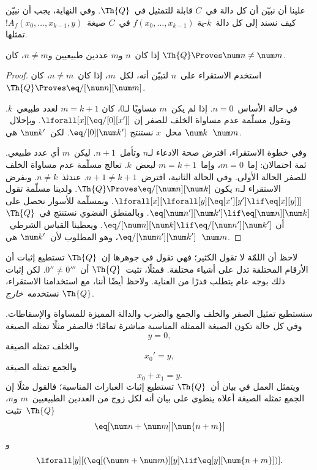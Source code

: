 \documentclass[../../../include/open-logic-section]{subfiles}
\begin{document}

علينا أن نبيّن أن كل دالة في~$C$ قابلة للتمثيل في~$\Th{Q}$. وفي
النهاية، يجب أن نبيّن كيف نسند إلى كل دالة~$k$-ية
$f(x_0,\dots,x_{k-1})$ في~$C$ صيغة~$!A_f(x_0,\dots,x_{k-1},y)$
تمثلها.

\begin{lem}
إذا كان~$n$ و$m$ عددين طبيعيين و$n \neq m$، كان
$\Th{Q} \Proves \num n \neq \num m$.
\end{lem}

\begin{proof}
استخدم الاستقراء على~$n$ لتبيّن أنه، لكل~$m$، إذا كان~$n \neq m$،
كان~$\Th{Q} \Proves \eq/[\num n][\num m]$.

في حالة الأساس~$n = 0$. إذا لم يكن~$m$ مساويًا لـ$0$، كان
$m = k + 1$ لعدد طبيعي~$k$. وتقول مسلّمة عدم مساواة الخلف للصفر إن
$\lforall[x][\eq/[0][x']]$. وبإحلال~$\num k$ محل~$x$ نستنتج
$\eq/[0][\num k']$. لكن~$\num k'$ هي~$\num m$.

وفي خطوة الاستقراء، افترض صحة الادعاء لـ$n$ وتأمل~$n+1$. ليكن~$m$
أي عدد طبيعي. ثمة احتمالان: إما~$m = 0$، وإما~$m = k+1$ لبعض~$k$.
تعالج مسلّمة عدم مساواة الخلف للصفر الحالة الأولى. وفي الحالة الثانية،
افترض~$n+1 \neq k+1$. عندئذ~$n \neq k$. وبفرض الاستقراء لـ$n$ يكون
$\Th{Q} \Proves \eq/[\num n][\num k]$. ولدينا مسلّمة تقول
$\lforall[x][\lforall[y][\eq[x'][y'] \lif \eq[x][y]]]$. وبمسلّمة
للأسوار نحصل على
$\eq[\num n'][\num k'] \lif \eq[\num n][\num k]$. وبالمنطق القضوي
نستنتج في~$\Th{Q}$ أن
$\eq/[\num n][\num k] \lif \eq/[\num n'][\num k']$. ويعطينا
القياس الشرطي~$\eq/[\num n'][\num k']$، وهو المطلوب لأن~$\num k'$
هي~$\num m$.
\end{proof}

لاحظ أن اللمّة لا تقول الكثير؛ فهي تقول في جوهرها إن~$\Th{Q}$ تستطيع
إثبات أن الأرقام المختلفة تدل على أشياء مختلفة. فمثلًا، تثبت~$\Th{Q}$
أن~$0'' \neq 0'''$. لكن إثبات ذلك بوجه عام يتطلب قدرًا من العناية.
ولاحظ أيضًا أننا، مع استخدامنا الاستقراء، نستخدمه~\emph{خارج}
$\Th{Q}$.

سنستطيع تمثيل الصفر والخلف والجمع والضرب والدالة المميزة للمساواة
والإسقاطات. وفي كل حالة تكون الصيغة الممثلة المناسبة مباشرة تمامًا؛
فالصفر مثلًا تمثله الصيغة
\[
y = 0,
\]
والخلف تمثله الصيغة
\[
x_0' = y,
\]
والجمع تمثله الصيغة
\[
x_0 + x_1 = y.
\]
ويتمثل العمل في بيان أن~$\Th{Q}$ تستطيع إثبات العبارات المناسبة؛
فالقول مثلًا إن الجمع تمثله الصيغة أعلاه ينطوي على بيان أنه لكل زوج
من العددين الطبيعيين~$m$ و$n$، تثبت~$\Th{Q}$
\[
\eq[\num n + \num m][\num {n+m}]
\]
و
\[
\lforall[y][(\eq[(\num n + \num m)][y] \lif \eq[y][\num {n+m}])].
\]
\end{document}
